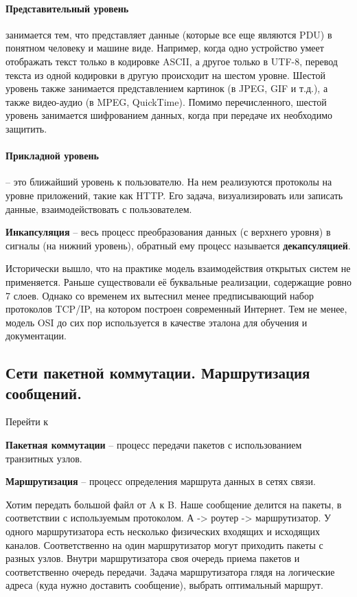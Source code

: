 \paragraph*{Представительный уровень}\label{b17:osi:lev6} занимается тем, что представляет данные (которые все еще являются PDU) в понятном человеку и машине виде. Например, когда одно устройство умеет отображать текст только в кодировке ASCII, а другое только в UTF-8, перевод текста из одной кодировки в другую происходит на шестом уровне.
Шестой уровень также занимается представлением картинок (в JPEG, GIF и т.д.), а также видео-аудио (в MPEG, QuickTime). Помимо перечисленного, шестой уровень занимается шифрованием данных, когда при передаче их необходимо защитить.

\paragraph*{Прикладной уровень}\label{b17:osi:lev7} -- это ближайший уровень к пользователю. На нем реализуются протоколы на уровне приложений, такие как HTTP.  Его задача, визуализировать или записать данные, взаимодействовать с пользователем.
\bigskip

\textbf{Инкапсуляция} -- весь процесс преобразования данных (с верхнего уровня) в сигналы (на нижний уровень), обратный ему процесс называется \textbf{декапсуляцией}.

Исторически вышло, что на практике модель взаимодействия открытых систем не применяется. Раньше существовали её буквальные реализации, содержащие ровно 7 слоев. Однако со временем их вытеснил менее предписывающий набор протоколов TCP/IP, на котором построен современный Интернет. Тем не менее, модель OSI до сих пор используется в качестве эталона для обучения и документации.


\subsection*{Сети пакетной коммутации. Маршрутизация сообщений.}\label{b17:part2}

Перейти к~

\textbf{Пакетная коммутации} -- процесс передачи пакетов с использованием транзитных узлов.

\textbf{Маршрутизация} -- процесс определения маршрута данных в сетях связи.

Хотим передать большой файл от A к B. Наше сообщение делится на пакеты, в соответствии с используемым протоколом.
А -> роутер -> маршрутизатор.
У одного маршрутизатора есть несколько физических входящих и исходящих каналов. Соответственно на один маршрутизатор могут приходить пакеты с разных узлов. Внутри маршрутизатора своя очередь приема пакетов и соответственно очередь передачи.
Задача маршрутизатора глядя на логические адреса (куда нужно доставить сообщение), выбрать оптимальный маршрут.

